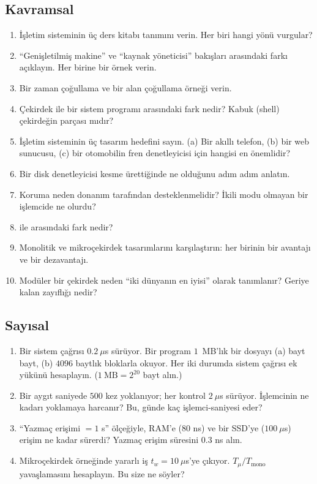 \subsection*{Kavramsal}
\begin{enumerate}[leftmargin=1.6em]
  \item İşletim sisteminin üç ders kitabı tanımını verin. Her biri hangi yönü vurgular?
  \item ``Genişletilmiş makine'' ve ``kaynak yöneticisi'' bakışları arasındaki farkı açıklayın. Her birine bir örnek verin.
  \item Bir zaman çoğullama ve bir alan çoğullama örneği verin.
  \item Çekirdek ile bir sistem programı arasındaki fark nedir? Kabuk (shell) çekirdeğin parçası mıdır?
  \item İşletim sisteminin üç tasarım hedefini sayın. (a) Bir akıllı telefon, (b) bir web sunucusu, (c) bir otomobilin fren denetleyicisi için hangisi en önemlidir?
  \item Bir disk denetleyicisi kesme ürettiğinde ne olduğunu adım adım anlatın.
  \item Koruma neden donanım tarafından desteklenmelidir? İkili modu olmayan bir işlemcide ne olurdu?
  \item {} ile  arasındaki fark nedir?
  \item Monolitik ve mikroçekirdek tasarımlarını karşılaştırın: her birinin bir avantajı ve bir dezavantajı.
  \item Modüler bir çekirdek neden ``iki dünyanın en iyisi'' olarak tanımlanır? Geriye kalan zayıflığı nedir?
\end{enumerate}

\subsection*{Sayısal}
\begin{enumerate}[leftmargin=1.6em,resume]
  \item Bir sistem çağrısı $0.2\ \mu$s sürüyor. Bir program $1$~MB'lık bir dosyayı (a) bayt bayt, (b) $4096$ baytlık bloklarla okuyor. Her iki durumda sistem çağrısı ek yükünü hesaplayın. ($1\ \text{MB} = 2^{20}$ bayt alın.)
  \item Bir aygıt saniyede $500$ kez yoklanıyor; her kontrol $2\ \mu$s sürüyor. İşlemcinin ne kadarı yoklamaya harcanır? Bu, günde kaç işlemci-saniyesi eder?
  \item ``Yazmaç erişimi $=1$ s'' ölçeğiyle, RAM'e ($80$ ns) ve bir SSD'ye ($100\ \mu$s) erişim ne kadar sürerdi? Yazmaç erişim süresini $0.3$ ns alın.
  \item Mikroçekirdek örneğinde yararlı iş $t_{w} = 10\ \mu$s'ye çıkıyor. $T_{\mu}/T_{\text{mono}}$ yavaşlamasını hesaplayın. Bu size ne söyler?
\end{enumerate}

